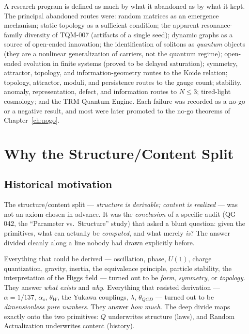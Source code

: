 \documentclass[10pt,twoside,openany]{book}
\begin{document}
A research program is defined as much by what it abandoned as by what it kept. The
principal abandoned routes were: random matrices as an emergence mechanism; static
topology as a sufficient condition; the apparent resonance-family diversity of TQM-007
(artifacts of a single seed); dynamic graphs as a source of open-ended innovation; the
identification of solitons as \emph{quantum} objects (they are a nonlinear generalization
of carriers, not the quantum regime); open-ended evolution in finite systems (proved to be
delayed saturation); symmetry, attractor, topology, and information-geometry routes to the
Koide relation; topology, attractor, moduli, and persistence routes to the gauge count;
stability, anomaly, representation, defect, and information routes to $N\le3$; tired-light
cosmology; and the TRM Quantum Engine. Each failure was recorded as a no-go or a negative
result, and most were later promoted to the no-go theorems of Chapter~\ref{ch:nogo}.

\chapter{Why the Structure/Content Split}
\label{ch:split}

\section{Historical motivation}

The structure/content split --- \emph{structure is derivable; content is realized} --- was
not an axiom chosen in advance. It was the \emph{conclusion} of a specific audit
(QG-042, the ``Parameter vs.\ Structure'' study) that asked a blunt question: given the
primitives, what can actually be \emph{computed}, and what merely \emph{is}? The answer
divided cleanly along a line nobody had drawn explicitly before.

Everything that could be derived --- oscillation, phase, $U(1)$, charge quantization,
gravity, inertia, the equivalence principle, particle stability, the interpretation of the
Higgs field --- turned out to be \emph{form}, \emph{symmetry}, or \emph{topology}. They
answer \emph{what exists} and \emph{why}. Everything that resisted derivation ---
$\alpha=1/137$, $\alpha_s$, $\theta_W$, the Yukawa couplings, $\lambda$, $\theta_{QCD}$ ---
turned out to be \emph{dimensionless pure numbers}. They answer \emph{how much}. The deep
divide maps exactly onto the two primitives: $Q$ underwrites structure (laws), and Random
Actualization underwrites content (history).
\end{document}
